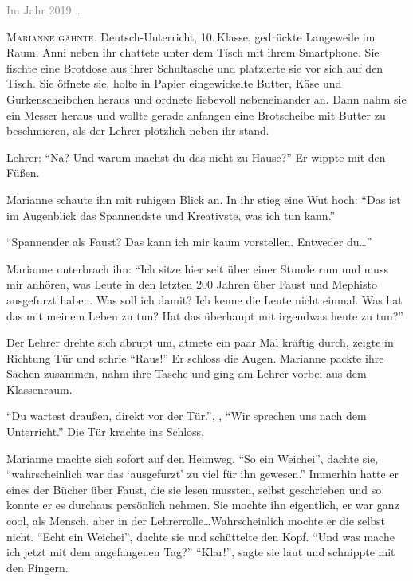 \label{cha:2019_marianne}

\textcolor{gray}{Im Jahr 2019 \dots} %

\textsc{Marianne gähnte}. Deutsch-Unterricht, 10.\,Klasse, gedrückte Langeweile im Raum.
Anni neben ihr chattete unter dem Tisch mit ihrem Smartphone.
Sie fischte eine Brotdose aus ihrer Schultasche und platzierte sie vor sich auf den Tisch.
Sie öffnete sie, holte in Papier eingewickelte Butter, Käse und Gurkenscheibchen heraus und ordnete  liebevoll nebeneinander an.
Dann nahm sie ein Messer heraus und wollte gerade anfangen eine Brotscheibe mit Butter zu beschmieren, als der Lehrer plötzlich neben ihr stand.


Lehrer: \enquote{Na? Und warum machst du das nicht zu Hause?} Er wippte mit den Füßen.

Marianne schaute ihn mit ruhigem Blick an.
In ihr stieg eine Wut hoch: \enquote{Das ist im Augenblick das Spannendste und Kreativste, was ich tun kann.}

\enquote{Spannender als Faust? Das kann ich mir kaum vorstellen.
Entweder du\dots}

Marianne unterbrach ihn: \enquote{Ich sitze hier seit über einer Stunde rum und muss mir anhören, was Leute in den letzten 200 Jahren über Faust und Mephisto ausgefurzt haben.
Was soll ich damit?
Ich kenne die Leute nicht einmal.
Was hat das mit meinem Leben zu tun?
Hat das überhaupt mit irgendwas heute zu tun?}

Der Lehrer drehte sich abrupt um, atmete ein paar Mal kräftig durch, zeigte in Richtung Tür und schrie \enquote{Raus!}
Er schloss die Augen.
Marianne packte ihre Sachen zusammen, nahm ihre Tasche und ging am Lehrer vorbei aus dem Klassenraum.

\enquote{Du wartest draußen, direkt vor der Tür.}, , \enquote{Wir sprechen uns nach dem Unterricht.}
Die Tür krachte ins Schloss.

Marianne machte sich sofort auf den Heimweg.
\enquote{So ein Weichei}, dachte sie, \enquote{wahrscheinlich war das \enquote{ausgefurzt} zu viel für ihn gewesen.} Immerhin hatte er eines der Bücher über Faust, die sie lesen mussten, selbst geschrieben und so konnte er es durchaus persönlich nehmen.
Sie mochte ihn eigentlich, er war ganz cool, als Mensch, aber in der Lehrerrolle\dots Wahrscheinlich mochte er die selbst nicht.
\enquote{Echt ein Weichei}, dachte sie und schüttelte den Kopf.
\enquote{Und was mache ich jetzt mit dem angefangenen Tag?} \enquote{Klar!}, sagte sie laut und schnippte mit den Fingern.


